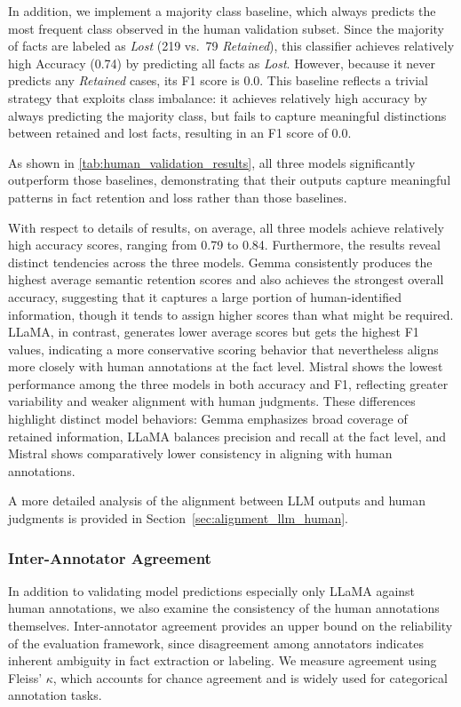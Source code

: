 \documentclass{DESSThesis}
\begin{document}
In addition, we implement a majority class baseline, which always predicts the most frequent class observed in the human validation subset. Since the majority of facts are labeled as \textit{Lost} (219 vs.\ 79 \textit{Retained}), this classifier achieves relatively high Accuracy (0.74) by predicting all facts as \textit{Lost}. However, because it never predicts any \textit{Retained} cases, its F1 score is 0.0. This baseline reflects a trivial strategy that exploits class imbalance: it achieves relatively high accuracy by always predicting the majority class, but fails to capture meaningful distinctions between retained and lost facts, resulting in an F1 score of 0.0.

As shown in \autoref{tab:human_validation_results}, all three models significantly outperform those baselines, demonstrating that their outputs capture meaningful patterns in fact retention and loss rather than those baselines.

With respect to details of results, on average, all three models achieve relatively high accuracy scores, ranging from 0.79 to 0.84. Furthermore, the results reveal distinct tendencies across the three models. Gemma consistently produces the highest average semantic retention scores and also achieves the strongest overall accuracy, suggesting that it captures a large portion of human-identified information, though it tends to assign higher scores than what might be required. LLaMA, in contrast, generates lower average scores but gets the highest F1 values, indicating a more conservative scoring behavior that nevertheless aligns more closely with human annotations at the fact level. Mistral shows the lowest performance among the three models in both accuracy and F1, reflecting greater variability and weaker alignment with human judgments. These differences highlight distinct model behaviors: Gemma emphasizes broad coverage of retained information, LLaMA balances precision and recall at the fact level, and Mistral shows comparatively lower consistency in aligning with human annotations.

A more detailed analysis of the alignment between LLM outputs and human judgments is provided in Section~\ref{sec:alignment_llm_human}.

\subsubsection{Inter-Annotator Agreement}
In addition to validating model predictions especially only LLaMA against human annotations, we also examine the consistency of the human annotations themselves. Inter-annotator agreement provides an upper bound on the reliability of the evaluation framework, since disagreement among annotators indicates inherent ambiguity in fact extraction or labeling. We measure agreement using Fleiss' $\kappa$, which accounts for chance agreement and is widely used for categorical annotation tasks. 
\end{document}
